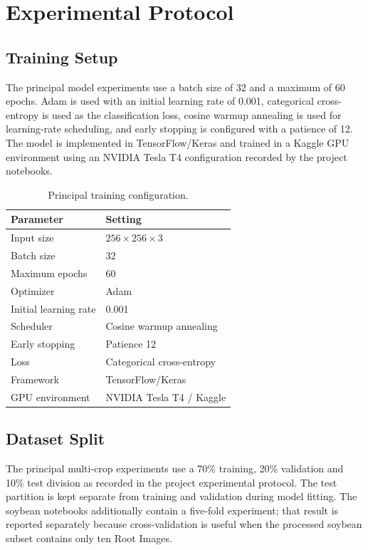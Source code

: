 \documentclass[a4paper,fleqn]{cas-dc}
\begin{document}
\section{Experimental Protocol}
\subsection{Training Setup}
The principal model experiments use a batch size of 32 and a maximum of 60 epochs. Adam is used with an initial learning rate of 0.001, categorical cross-entropy is used as the classification loss, cosine warmup annealing is used for learning-rate scheduling, and early stopping is configured with a patience of 12. The model is implemented in TensorFlow/Keras and trained in a Kaggle GPU environment using an NVIDIA Tesla T4 configuration recorded by the project notebooks.

\begin{table}[!t]
\centering
\caption{Principal training configuration.}
\label{tab:training}
\begin{tabular}{p{4.2cm}p{3.0cm}}
\toprule
Parameter & Setting \\
\midrule
Input size & $256\times256\times3$ \\
Batch size & 32 \\
Maximum epochs & 60 \\
Optimizer & Adam \\
Initial learning rate & 0.001 \\
Scheduler & Cosine warmup annealing \\
Early stopping & Patience 12 \\
Loss & Categorical cross-entropy \\
Framework & TensorFlow/Keras \\
GPU environment & NVIDIA Tesla T4 / Kaggle \\
\bottomrule
\end{tabular}
\end{table}

\subsection{Dataset Split}
The principal multi-crop experiments use a 70\% training, 20\% validation and 10\% test division as recorded in the project experimental protocol. The test partition is kept separate from training and validation during model fitting. The soybean notebooks additionally contain a five-fold experiment; that result is reported separately because cross-validation is useful when the processed soybean subset contains only ten Root Images.
\end{document}
